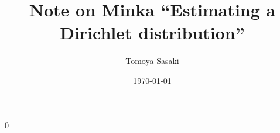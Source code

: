 \documentclass[10.5pt,letterpaper]{article}
\theoremstyle{plain}
\begin{document}
\newcommand{\blind}{0}

\newcommand{\E}{\mathbb{E}}
\newcommand\dist{\buildrel\rm d\over\sim}
\newcommand\ind{\stackrel{\rm indep.}{\sim}}
\newcommand\iid{\stackrel{\rm i.i.d.}{\sim}}
\newcommand\logit{{\rm logit}}
\renewcommand\r{\right}
\renewcommand\l{\left}

\newcommand{\kprime}{k^{'}}
\newcommand{\zdel}{\mathbf{z}^{\backslash d,i}}
\newcommand{\cD}{\mathcal{D}}
\newcommand{\cN}{\mathcal{N}}
\newcommand{\cS}{\mathcal{S}}
\newcommand{\cY}{\mathcal{Y}}
\newcommand{\btheta}{\boldsymbol{\theta}}
\newcommand{\bbeta}{\boldsymbol{\beta}}
\newcommand{\boldeta}{\boldsymbol{\eta}}
\newcommand{\balpha}{\boldsymbol{\alpha}}
\newcommand{\bsigma}{\boldsymbol{\sigma}}
\newcommand{\bgamma}{\boldsymbol{\gamma}}
\newcommand{\blambda}{\boldsymbol{\lambda}}
\newcommand{\bphi}{\boldsymbol{\phi}}
\newcommand{\bpsi}{\boldsymbol{\psi}}
\newcommand{\bpi}{\boldsymbol{\pi}}
\newcommand{\bh}{\mathbf{h}}
\newcommand{\bv}{\mathbf{v}}
\newcommand{\bA}{\mathbf{A}}
\newcommand{\bB}{\mathbf{B}}
\newcommand{\bC}{\mathbf{C}}
\newcommand{\bZ}{\mathbf{Z}}
\newcommand{\bW}{\mathbf{W}}
\newcommand{\bX}{\mathbf{X}}
\newcommand{\bz}{\mathbf{z}}
\newcommand{\bw}{\mathbf{w}}
\newcommand{\bx}{\mathbf{x}}
\newcommand{\bY}{\mathbf{Y}}
\newcommand{\bp}{\mathbf{p}}
\newcommand{\rmDir}{{\rm Dir}}
\newcommand{\rmMulti}{{\rm Multi}}
\newcommand{\rmBeta}{{\rm Beta}}
\newcommand{\rmBern}{{\rm Bern}}
\newcommand{\rmGamma}{{\rm Gamma}}
\newcommand{\bH}{\mathbf{H}}
\newcommand{\bQ}{\mathbf{Q}}
\newcommand{\bg}{\mathbf{g}}
\newcommand{\bone}{\mathbf{1}}
\newcommand{\p}{\prime}

\newcommand{\blurb}[1]{\footnotesize \flushleft #1}
\newcommand{\pre}[1]{\texttt{#1}}
\newcommand{\R}{\textbf{\textsf{R}}}

\newcommand{\argmax}{\operatornamewithlimits{argmax}}
\newcommand{\argmin}{\operatornamewithlimits{argmin}}

\newcommand\spacingset[1]{\renewcommand{\baselinestretch}%
{#1}\small\normalsize}

\spacingset{1.25}


\blind

\title{Note on Minka ``Estimating a Dirichlet distribution''}
\author{Tomoya Sasaki}
\date{\today}
\maketitle
\end{document}
